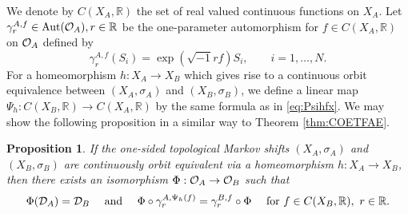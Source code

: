 \documentclass[11pt]{article}
\newtheorem{proposition}[theorem]{Proposition}
\theoremstyle{plain}
\theoremstyle{definition}
\numberwithin{equation}{section}
\newcommand{\R}{\mathbb{R}}
\begin{document}
We denote by $C(X_A,\R)$ 
the set of real valued continuous functions
on $X_A$.
Let
$\gamma^{A,f}_r\in\Aut(\OA), r \in \R$ 
be the one-parameter automorphism for $f \in C(X_A,\R)$
on ${{\mathcal{O}}_A}$
defined by
\begin{equation}
\gamma^{A,f}_r(S_i) = \exp(\sqrt{-1}r f)S_i, \qquad i=1,\dots,N. 
\label{eq:gammaArf}
\end{equation}
For a homeomorphism $h:X_A\rightarrow X_B$ 
which gives rise to a continuous orbit equivalence 
between 
$(X_A, \sigma_A)$
and 
$(X_B, \sigma_B)$,
we define a linear map 
$\Psi_h: C(X_B, \R)\rightarrow C(X_A,\R)$
by the same formula  as in \eqref{eq:Psihfx}.
We may show the following proposition
in a similar way to Theorem \ref{thm:COETFAE}. 
\begin{proposition}\label{prop:COETFAER}
If the one-sided topological Markov shifts
$(X_A, \sigma_A)$ and $(X_B,\sigma_B)$
are continuously orbit equivalent
via a homeomorphism $h:X_A\rightarrow X_B$,
then there exists an isomorphism
$\Phi:{{\mathcal{O}}_A} \rightarrow {{\mathcal{O}}_B}$ such that 
\begin{equation*}
\Phi(\DA) = \DB
\quad 
\text{  and }
\quad
\Phi \circ \gamma^{A,\Psi_h(f)}_r = \gamma^{B,f}_r \circ \Phi
\quad
\text{ for }
f \in C(X_B,\R), \,\, 
 r \in \R.
\end{equation*}
\end{proposition}






\end{document}
